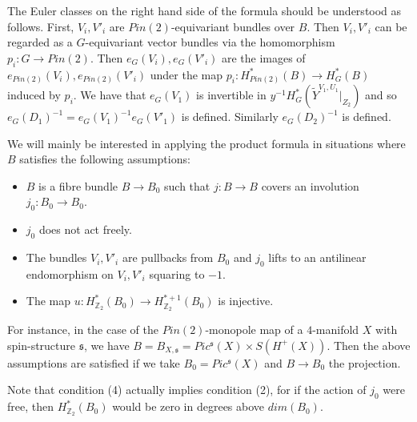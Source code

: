 \documentclass{amsart}
\theoremstyle{definition}
\theoremstyle{remark}
\numberwithin{equation}{section}
\begin{document}
The Euler classes on the right hand side of the formula should be understood as follows. First, $V_i, V'_i$ are $Pin(2)$-equivariant bundles over $B$. Then $V_i, V'_i$ can be regarded as a $G$-equivariant vector bundles via the homomorphism $p_i : G \to Pin(2)$. Then $e_{G}(V_i), e_{G}(V'_i)$ are the images of $e_{Pin(2)}( V_i ), e_{Pin(2)}(V'_i)$ under the map $p_i : H^*_{Pin(2)}(B) \to H^*_G(B)$ induced by $p_i$. We have that $e_{G}(V_1)$ is invertible in $y^{-1}H^*_G(\widetilde{Y}^{V_1,U_1}|_{Z_2})$ and so $e_{G}(D_1)^{-1} =  e_{G}(V_1)^{-1} e_{G}(V'_1)$ is defined. Similarly $e_{G}(D_2)^{-1}$ is defined.

We will mainly be interested in applying the product formula in situations where $B$ satisfies the following assumptions:
\begin{itemize}
\item[(1)]{$B$ is a fibre bundle $B \to B_0$ such that $j : B \to B$ covers an involution $j_0 : B_0 \to B_0$.}
\item[(2)]{$j_0$ does not act freely.}
\item[(3)]{The bundles $V_i, V'_i$ are pullbacks from $B_0$ and $j_0$ lifts to an antilinear endomorphism on $V_i, V'_i$ squaring to $-1$.}
\item[(4)]{The map $u : H^*_{\mathbb{Z}_2}(B_0) \to H^{*+1}_{\mathbb{Z}_2}(B_0)$ is injective.}
\end{itemize}

For instance, in the case of the $Pin(2)$-monopole map of a $4$-manifold $X$ with spin-structure $\mathfrak{s}$, we have $B = B_{X,\mathfrak{s}} = Pic^{\mathfrak{s}}(X) \times S(H^+(X))$. Then the above assumptions are satisfied if we take $B_0 = Pic^{\mathfrak{s}}(X)$ and $B \to B_0$ the projection.

Note that condition (4) actually implies condition (2), for if the action of $j_0$ were free, then $H^*_{\mathbb{Z}_2}(B_0)$ would be zero in degrees above $dim(B_0)$.
\end{document}
